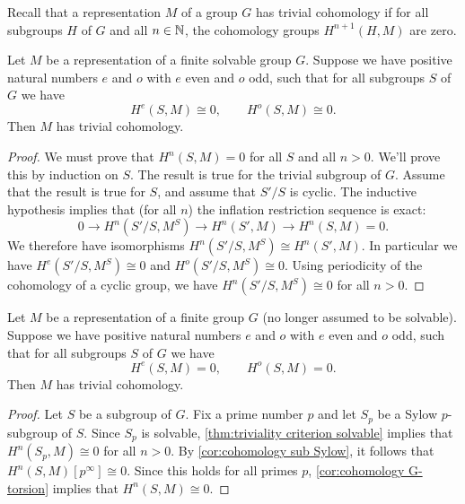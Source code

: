 Recall that a representation $M$ of a group $G$ has trivial cohomology if for all subgroups $H$ of
$G$ and all $n \in {\mathbb N}$, the cohomology groups $H^{n+1}(H,M)$ are zero.

\begin{theorem} \label{thm:triviality criterion solvable}
	Let $M$ be a representation of a finite solvable group $G$.
	Suppose we have positive natural numbers $e$ and $o$ with $e$ even and $o$ odd,
	such that for all subgroups $S$ of $G$ we have
	\[
		H^e(S,M) \cong 0, \qquad H^o(S,M) \cong 0.
	\]
	Then $M$ has trivial cohomology.
\end{theorem}

\begin{proof}
	We must prove that $H^{n}(S,M) = 0$ for all $S$ and all $n > 0$.
	We'll prove this by induction on $S$. The result is true for the trivial subgroup of $G$.
	Assume that the result is true for $S$, and assume that $S' / S$ is cyclic.
	The inductive hypothesis implies that (for all $n$) the inflation restriction sequence is exact:
	\[
		0 \to H^{n} (S'/S, M^S) \to H^{n}(S' , M) \to H^{n}(S,M)= 0.
	\]
	We therefore have isomorphisms $H^{n} (S'/S, M^S) \cong H^{n}(S' , M)$.
	In particular we have $H^{e} (S'/S, M^S) \cong 0$ and $H^{o} (S'/S, M^S) \cong 0$.
	Using periodicity of the cohomology of a cyclic group, we have $H^{n}(S'/S,M^S) \cong 0$
	for all $n>0$.
\end{proof}

\begin{theorem} \label{thm:triviality criterion}
	Let $M$ be a representation of a finite group $G$ (no longer assumed to be solvable).
	Suppose we have positive natural numbers $e$ and $o$ with $e$ even and $o$ odd, such that for all
	subgroups $S$ of $G$ we have
	\[
		H^e(S,M) =0, \qquad H^o(S,M) = 0.
	\]
	Then $M$ has trivial cohomology.
\end{theorem}

\begin{proof}
	Let $S$ be a subgroup of $G$.
	Fix a prime number $p$ and let $S_p$ be a Sylow $p$-subgroup of $S$.
	Since $S_p$ is solvable, \ref{thm:triviality criterion solvable} implies that
	$H^n(S_p,M) \cong 0$ for all $n > 0$.
	By \ref{cor:cohomology sub Sylow}, it follows that $H^n(S,M)[p^\infty] \cong 0$.
	Since this holds for all primes $p$,
	\ref{cor:cohomology G-torsion} implies that $H^n(S,M) \cong 0$.
\end{proof}

